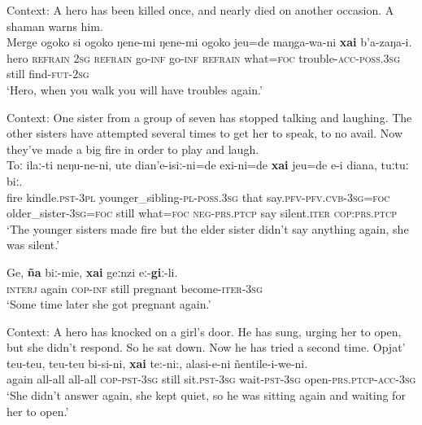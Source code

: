 \begin{exe}
	\ex\label{exAppendixUdiheIterative1}
	Context: A hero has been killed once, and nearly died on another occasion. A shaman warns him.\\
	\gll Merge ogoko si ogoko ŋene-mi ŋene-mi ogoko jeu=de maŋga-wa-ni \textbf{xai} b’a-zaŋa-i.\\
	hero \textsc{refrain} 2\textsc{sg} \textsc{refrain} go-\textsc{inf} go-\textsc{inf} \textsc{refrain} what=\textsc{foc} trouble-\textsc{acc}-\textsc{poss}.3\textsc{sg} still find-\textsc{fut}-2\textsc{sg}\\
	\glt \lq Hero, when you walk you will have troubles again.' \parencite[Sisam Zauli and the hero]{NikolaevaEtAl2019}

	\ex\label{exAppendixUdiheIterative2}
	Context: One sister from a group of seven has stopped talking and laughing. The other sisters have attempted several times to get her to speak, to no avail. Now they've made a big fire in order to play and laugh.\\
	\gll Toː ilaː-ti neŋu-ne-ni, ute dian'e-isiː-ni=de exi-ni=de \textbf{xai} jeu=de e-i diana, tuːtuː biː.\\
	fire kindle.\textsc{pst}-3\textsc{pl} younger\_sibling-\textsc{pl}-\textsc{poss}.3\textsc{sg} that say.\textsc{pfv}-\textsc{pfv}.\textsc{cvb}-3\textsc{sg}=\textsc{foc} older\_sister-3\textsc{sg}=\textsc{foc} still what=\textsc{foc} \textsc{neg}-\textsc{prs}.\textsc{ptcp} say silent.\textsc{iter} \textsc{cop}:\textsc{prs}.\textsc{ptcp}\\
	\glt \lq The younger sisters made fire but the elder sister didn’t say anything again, she was silent.' \parencite[The seven sisters]{NikolaevaEtAl2019}

	\ex\label{exAppendixUdiheIterative3}
	\gll Ge, \textbf{ña} biː-mie, \textbf{xai} geːnzi eː-\textbf{giː}-li.\\
	\textsc{interj} again \textsc{cop}-\textsc{inf} still pregnant become-\textsc{iter}-3\textsc{sg}\\
	\glt \lq Some time later she got pregnant again.' \parencite[106–107]{NikolaevaEtAl2003} 	
	
\ex\label{exAppendixUdiheIterative4}
	Context: A hero has knocked on a girl’s door. He has sung, urging her to open, but she didn’t respond. So he sat down. Now he has tried a second time.
	\exi{}\gll Opjat’ teu-teu, teu-teu bi-si-ni, \textbf{xai} te:-ni:, alasi-e-ni ñentile-i-we-ni.\\
	again all-all all-all \textsc{cop}-\textsc{pst}-3\textsc{sg} still sit.\textsc{pst}-3\textsc{sg} wait-\textsc{pst}-3\textsc{sg} open-\textsc{prs}.\textsc{ptcp}-\textsc{acc}-3\textsc{sg}\\
	\glt \lq She didn’t answer again, she kept quiet, so he was sitting again and waiting for her to open.\rq{ }\parencite[When Yegdige ate an evil spirit]{NikolaevaEtAl2019}


\end{exe}
